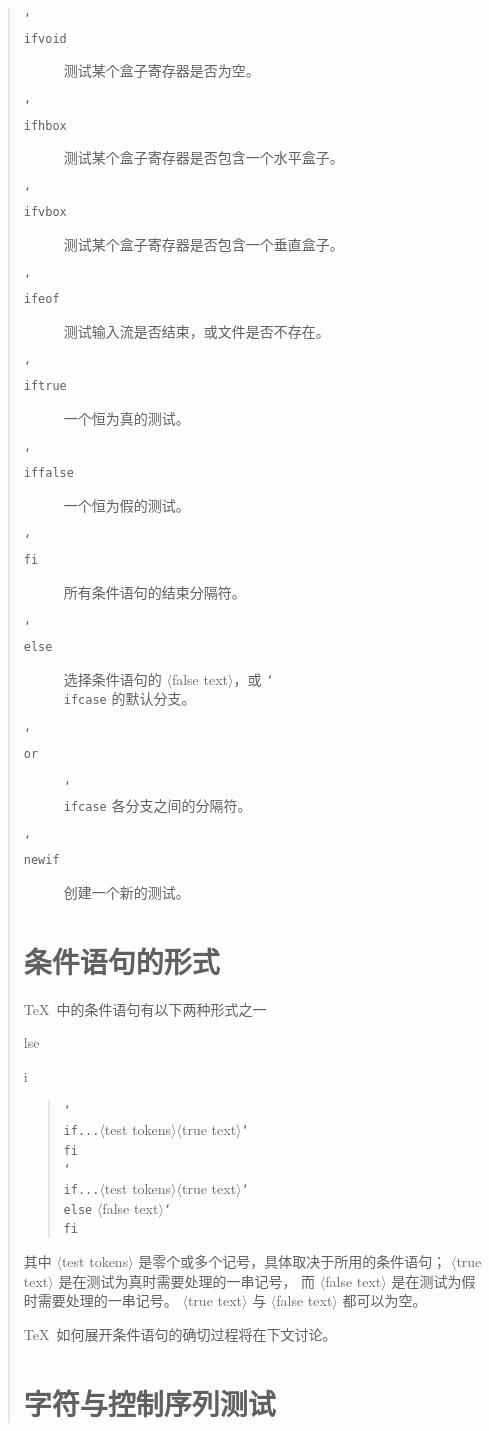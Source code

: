 \documentclass[a4paper]{rapport3}
\makeatletter
\def\nl{\protect\\}\def\n#1{{\tt #1}}\def\cs#1{{\tt\char`\\#1}}\let\csc\cs
\def\gr#1{$\langle$#1$\rangle$}\def\key#1{{\tt#1}}
\newenvironment{disp}{\begin{quotation}}{\end{quotation}}
\newenvironment{inventory}{\begin{description}}{\end{description}}
\def\cstoidx#1\par{\index{#1@\cs{#1}}}
\makeatother
\begin{document}
\begin{disp}
\begin{inventory}
\item [\cs{ifvoid}] 
      测试某个盒子寄存器是否为空。

\item [\cs{ifhbox}] 
      测试某个盒子寄存器是否包含一个水平盒子。

\item [\cs{ifvbox}] 
      测试某个盒子寄存器是否包含一个垂直盒子。 

\item [\cs{ifeof}] 
      测试输入流是否结束，或文件是否不存在。

\item [\cs{iftrue}] 
      一个恒为真的测试。
\item [\cs{iffalse}] 
      一个恒为假的测试。
\item [\cs{fi}] 
      所有条件语句的结束分隔符。

\item [\cs{else}] 
      选择条件语句的 \gr{false text}，或 \cs{ifcase} 的默认分支。

\item [\cs{or}] 
      \cs{ifcase} 各分支之间的分隔符。

\item [\cs{newif}] 
     创建一个新的测试。

\end{inventory}

\section{条件语句的形式}

\TeX\ 中的条件语句有以下两种形式之一
\cstoidx else\par\cstoidx fi\par
\begin{disp}\cs{if...}\gr{test tokens}\gr{true text}\cs{fi}\nl
     \cs{if...}\gr{test tokens}\gr{true text}\cs{else}%
     \gr{false text}\cs{fi}\end{disp}
其中 \gr{test tokens} 是零个或多个记号，具体取决于所用的条件语句；
\gr{true text} 是在测试为真时需要处理的一串记号，
而 \gr{false text} 是在测试为假时需要处理的一串记号。
\gr{true text} 与 \gr{false text} 都可以为空。

\TeX\ 如何展开条件语句的确切过程将在下文讨论。

\section{字符与控制序列测试}


\end{disp}
\end{document}
